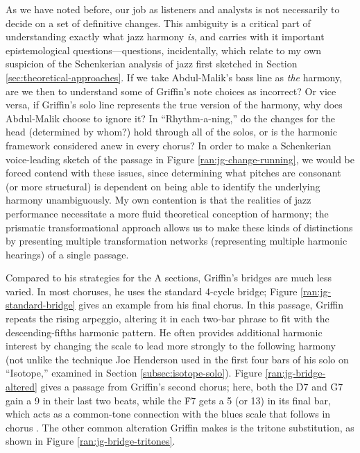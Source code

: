 As we have noted before, our job as listeners and analysts is not necessarily
to decide on a set of definitive changes. This ambiguity is a critical part of
understanding exactly what jazz harmony \emph{is}, and carries with it
important epistemological questions---questions, incidentally, which relate to
my own suspicion of the Schenkerian analysis of jazz first sketched in Section
\ref{sec:theoretical-approaches}. If we take Abdul-Malik's bass line as
\emph{the} harmony, are we then to understand some of Griffin's note choices
as incorrect? Or vice versa, if Griffin's solo line represents the true
version of the harmony, why does Abdul-Malik choose to ignore it? In
``Rhythm-a-ning,'' do the changes for the head (determined by whom?) hold
through all of the solos, or is the harmonic framework considered anew in
every chorus? In order to make a Schenkerian voice-leading sketch of the
passage in Figure \ref{ran:jg-change-running}, we would be forced contend with
these issues, since determining what pitches are consonant (or more
structural) is dependent on being able to identify the underlying harmony
unambiguously. My own contention is that the realities of jazz
performance necessitate a more fluid theoretical conception of harmony; the
prismatic transformational approach allows us to make these
kinds of distinctions by presenting multiple transformation networks
(representing multiple harmonic hearings) of a single passage.

Compared to his strategies for the A sections, Griffin's bridges are
much less varied. In most choruses, he uses the standard 4-cycle bridge;
Figure \ref{ran:jg-standard-bridge} gives an example from his final chorus. In
this passage, Griffin repeats the rising arpeggio, altering it in each two-bar
phrase to fit with the descending-fifths harmonic pattern. He often
provides additional harmonic interest by changing the scale to lead more
strongly to the following harmony (not unlike the technique Joe Henderson used
in the first four bars of his solo on ``Isotope,'' examined in Section
\ref{subsec:isotope-solo}). Figure \ref{ran:jg-bridge-altered} gives a passage
from Griffin's second chorus; here, both the \h{D7} and \h{G7} gain a \flat{}9
in their last two beats, while the \h{F7} gets a \sharp{}5 (or \flat{}13) in
its final bar, which acts as a common-tone connection with the \Bflat blues
scale that follows in chorus . The other common alteration Griffin
makes is the tritone substitution, as shown in Figure
\ref{ran:jg-bridge-tritones}.


